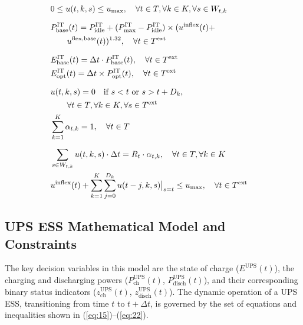 \documentclass[lettersize,journal]{IEEEtran}
\begin{document}
\begin{figure}[!t]
\centering
\label{fig:it-workload-equations}
\normalsize
\begin{align}
& 0 \le u(t,k,s) \le u_{\text{max}}, \quad \forall t \in T, \forall k \in K, \forall s \in W_{t,k} \label{eq:util_bounds} & \\[0.4\baselineskip]
& P^{\mathrm{IT}}_{\mathrm{base}}(t) = P^{\mathrm{IT}}_{\mathrm{idle}} + (P^{\mathrm{IT}}_{\mathrm{max}} - P^{\mathrm{IT}}_{\mathrm{idle}}) \times (u^{\text{inflex}}(t) + \nonumber \\ 
& \qquad u^{\text{flex,base}}(t))^{1.32}, \quad \forall t \in T^{\text{ext}} \label{eq:power_base} & \\[0.4\baselineskip]
& E^{\mathrm{IT}}_{\mathrm{base}}(t) = \Delta t \cdot P^{\mathrm{IT}}_{\mathrm{base}}(t), \quad \forall t \in T^{\text{ext}} \label{eq:energy_base} & \\
& E^{\mathrm{IT}}_{\mathrm{opt}}(t) = \Delta t \times P^{\mathrm{IT}}_{\mathrm{opt}}(t), \quad \forall t \in T^{\text{ext}} \label{eq:energy_optimised} & \\[0.4\baselineskip]
& u(t,k,s) = 0 \quad \text{if } s < t \text{ or } s > t + D_k, \nonumber \\ 
& \qquad \forall t \in T, \forall k \in K, \forall s \in T^{\text{ext}} \label{eq:feasibility} & \\
& \sum_{k=1}^{K} \alpha_{t,k} = 1, \quad \forall t \in T \label{eq:alpha_sum} & \\[0.4\baselineskip]
& \sum_{s \in W_{t,k}} u(t,k,s) \cdot \Delta t = R_t \cdot \alpha_{t,k}, \quad \forall t \in T, \forall k \in K \label{eq:job_completion} & \\
& u^{\text{inflex}}(t) + \sum_{k=1}^{K} \sum_{j=0}^{D_{k}} u(t-j, k, s)\big|_{s=t} \leq u_{\text{max}}, \quad \forall t \in T^{\text{ext}} \label{eq:cpu_capacity_new} &
\end{align}
\end{figure}

\subsection{UPS ESS Mathematical Model and Constraints}

 The key decision variables in this model are the state of charge ($E^{\mathrm{UPS}}(t)$), the charging and discharging powers ($P^{\mathrm{UPS}}_{\mathrm{ch}}(t)$, $P^{\mathrm{UPS}}_{\mathrm{disch}}(t)$), and their corresponding binary status indicators ($z^{\mathrm{UPS}}_{\mathrm{ch}}(t)$, $z^{\mathrm{UPS}}_{\mathrm{disch}}(t)$). The dynamic operation of a UPS ESS, transitioning from time \(t\) to \(t+\Delta t\), is governed by the set of equations and inequalities shown in (\ref{eq:15})--(\ref{eq:22}).
\end{document}
